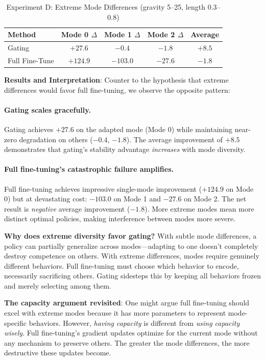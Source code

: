 \documentclass{article}
\begin{document}
\begin{table}[h]
\centering
\caption{Experiment D: Extreme Mode Differences (gravity 5--25, length 0.3--0.8)}
\label{tab:exp_d}
\begin{tabular}{@{}lcccc@{}}
\toprule
\textbf{Method} & \textbf{Mode 0 $\Delta$} & \textbf{Mode 1 $\Delta$} & \textbf{Mode 2 $\Delta$} & \textbf{Average} \\
\midrule
Gating & $+27.6$ & $-0.4$ & $-1.8$ & $+8.5$ \\
Full Fine-Tune & $+124.9$ & $-103.0$ & $-27.6$ & $-1.8$ \\
\bottomrule
\end{tabular}
\end{table}

\textbf{Results and Interpretation}: Counter to the hypothesis that extreme differences would favor full fine-tuning, we observe the opposite pattern:

\paragraph{Gating scales gracefully.} Gating achieves $+27.6$ on the adapted mode (Mode 0) while maintaining near-zero degradation on others ($-0.4$, $-1.8$). The average improvement of $+8.5$ demonstrates that gating's stability advantage \emph{increases} with mode diversity.

\paragraph{Full fine-tuning's catastrophic failure amplifies.} Full fine-tuning achieves impressive single-mode improvement ($+124.9$ on Mode 0) but at devastating cost: $-103.0$ on Mode 1 and $-27.6$ on Mode 2. The net result is \emph{negative} average improvement ($-1.8$). More extreme modes mean more distinct optimal policies, making interference between modes more severe.

\textbf{Why does extreme diversity favor gating?} With subtle mode differences, a policy can partially generalize across modes---adapting to one doesn't completely destroy competence on others. With extreme differences, modes require genuinely different behaviors. Full fine-tuning must choose which behavior to encode, necessarily sacrificing others. Gating sidesteps this by keeping all behaviors frozen and merely selecting among them.

\textbf{The capacity argument revisited}: One might argue full fine-tuning should excel with extreme modes because it has more parameters to represent mode-specific behaviors. However, \emph{having capacity} is different from \emph{using capacity wisely}. Full fine-tuning's gradient updates optimize for the current mode without any mechanism to preserve others. The greater the mode differences, the more destructive these updates become.
\end{document}
